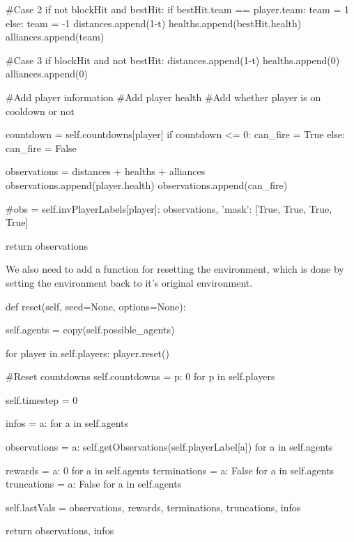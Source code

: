 \begin{mpy}
            #Case 2
            if not blockHit and bestHit:
                if bestHit.team == player.team:
                    team = 1
                else:
                    team = -1
                distances.append(1-t)
                healths.append(bestHit.health)
                alliances.append(team)

            #Case 3
            if blockHit and not bestHit:
                distances.append(1-t)
                healths.append(0)
                alliances.append(0)

        #Add player information
        #Add player health
        #Add whether player is on cooldown or not

        countdown = self.countdowns[player]
        if countdown <= 0:
            can_fire = True
        else:
            can_fire = False

        observations = distances + healths + alliances
        observations.append(player.health)
        observations.append(can_fire)

        #obs = {self.invPlayerLabels[player]: observations, 'mask': [True, True, True, True]}

        return observations
\end{mpy}


We also need to add a function for resetting the environment, which is done by setting the environment back to it's original environment.

\begin{mpy}
    def reset(self, seed=None, options=None):

        self.agents = copy(self.possible_agents)

        for player in self.players:
            player.reset()

        #Reset countdowns
        self.countdowns = {p: 0 for p in self.players}

        self.timestep = 0

        infos = {a: {} for a in self.agents}

        observations = {a: self.getObservations(self.playerLabel[a]) for a in self.agents}

        rewards = {a: 0 for a in self.agents}
        terminations = {a: False for a in self.agents}
        truncations = {a: False for a in self.agents}
        
        self.lastVals = observations, rewards, terminations, truncations, infos

        return observations, infos
\end{mpy}

